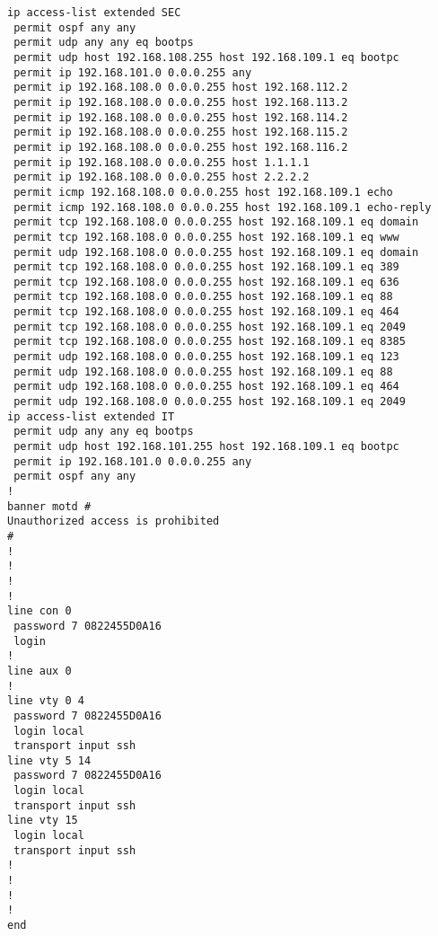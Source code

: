 \documentclass[14pt, a4paper]{extarticle}
\begin{document}
\begin{appendices}
\begin{lstlisting}[caption=Конфигурация устройства SW\_1\_L3\_IVANOV\label{list:conf_sw1_l3}]
ip access-list extended SEC
 permit ospf any any
 permit udp any any eq bootps
 permit udp host 192.168.108.255 host 192.168.109.1 eq bootpc
 permit ip 192.168.101.0 0.0.0.255 any
 permit ip 192.168.108.0 0.0.0.255 host 192.168.112.2
 permit ip 192.168.108.0 0.0.0.255 host 192.168.113.2
 permit ip 192.168.108.0 0.0.0.255 host 192.168.114.2
 permit ip 192.168.108.0 0.0.0.255 host 192.168.115.2
 permit ip 192.168.108.0 0.0.0.255 host 192.168.116.2
 permit ip 192.168.108.0 0.0.0.255 host 1.1.1.1
 permit ip 192.168.108.0 0.0.0.255 host 2.2.2.2
 permit icmp 192.168.108.0 0.0.0.255 host 192.168.109.1 echo
 permit icmp 192.168.108.0 0.0.0.255 host 192.168.109.1 echo-reply
 permit tcp 192.168.108.0 0.0.0.255 host 192.168.109.1 eq domain
 permit tcp 192.168.108.0 0.0.0.255 host 192.168.109.1 eq www
 permit udp 192.168.108.0 0.0.0.255 host 192.168.109.1 eq domain
 permit tcp 192.168.108.0 0.0.0.255 host 192.168.109.1 eq 389
 permit tcp 192.168.108.0 0.0.0.255 host 192.168.109.1 eq 636
 permit tcp 192.168.108.0 0.0.0.255 host 192.168.109.1 eq 88
 permit tcp 192.168.108.0 0.0.0.255 host 192.168.109.1 eq 464
 permit tcp 192.168.108.0 0.0.0.255 host 192.168.109.1 eq 2049
 permit tcp 192.168.108.0 0.0.0.255 host 192.168.109.1 eq 8385
 permit udp 192.168.108.0 0.0.0.255 host 192.168.109.1 eq 123
 permit udp 192.168.108.0 0.0.0.255 host 192.168.109.1 eq 88
 permit udp 192.168.108.0 0.0.0.255 host 192.168.109.1 eq 464
 permit udp 192.168.108.0 0.0.0.255 host 192.168.109.1 eq 2049
ip access-list extended IT
 permit udp any any eq bootps
 permit udp host 192.168.101.255 host 192.168.109.1 eq bootpc
 permit ip 192.168.101.0 0.0.0.255 any
 permit ospf any any
!
banner motd #
Unauthorized access is prohibited
#
!
!
!
!
line con 0
 password 7 0822455D0A16
 login
!
line aux 0
!
line vty 0 4
 password 7 0822455D0A16
 login local
 transport input ssh
line vty 5 14
 password 7 0822455D0A16
 login local
 transport input ssh
line vty 15
 login local
 transport input ssh
!
!
!
!
end

\end{lstlisting}


\end{appendices}
\end{document}
